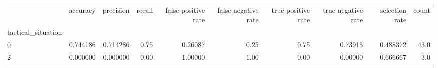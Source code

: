 \begin{tabular}{lrrrrrrrrr}
\toprule
{} &  accuracy &  precision &  recall &  false positive rate &  false negative rate &  true positive rate &  true negative rate &  selection rate &  count \\
tactical\_situation &           &            &         &                      &                      &                     &                     &                 &        \\
\midrule
0                  &  0.744186 &   0.714286 &    0.75 &              0.26087 &                 0.25 &                0.75 &             0.73913 &        0.488372 &   43.0 \\
2                  &  0.000000 &   0.000000 &    0.00 &              1.00000 &                 1.00 &                0.00 &             0.00000 &        0.666667 &    3.0 \\
\bottomrule
\end{tabular}
